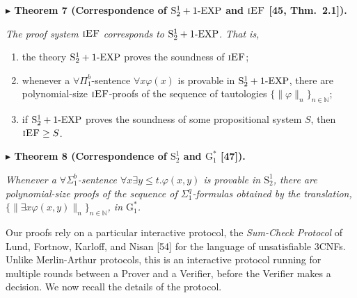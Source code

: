 \documentclass[11pt]{article}
\newcommand{\Stwo}{\mathrm{S}^{1}_{2}}
\newcommand{\oneEXP}{\textnormal{1-EXP}}
\newcommand{\iEF}{\textsc{iEF}}
\newcommand{\Gstar}{\mathrm{G}^{*}_{1}}
\newcommand{\N}{\mathbb{N}}
\newenvironment{statement}[1]%
  {\par\medskip\noindent\textbf{#1}\par\nopagebreak\smallskip\noindent\itshape}%
  {\par\medskip}
\begin{document}

\begin{statement}{$\blacktriangleright$ Theorem 7 (Correspondence of $\Stwo+\oneEXP$ and $\iEF$ [45, Thm.\ 2.1]).}
The proof system $\iEF$ corresponds to $\Stwo+\oneEXP$. That is,
\begin{enumerate}
\item[(i)] the theory $\Stwo+\oneEXP$ proves the soundness of $\iEF$;
\item[(ii)] whenever a $\forall\Pi^{b}_{1}$-sentence $\forall x\varphi(x)$ is provable in
  $\Stwo+\oneEXP$, there are polynomial-size $\iEF$-proofs of the sequence of tautologies
  $\{\|\varphi\|_{n}\}_{n\in\N}$;
\item[(iii)] if $\Stwo+\oneEXP$ proves the soundness of some propositional system $S$, then
  $\iEF \ge S$.
\end{enumerate}
\end{statement}

\begin{statement}{$\blacktriangleright$ Theorem 8 (Correspondence of $\Stwo$ and $\Gstar$ [47]).}
Whenever a $\forall\Sigma^{b}_{1}$-sentence $\forall x\exists y \le t.\varphi(x,y)$ is provable
in $\Stwo$, there are polynomial-size proofs of the sequence of $\Sigma^{q}_{1}$-formulas
obtained by the translation, $\{\|\exists x\varphi(x,y)\|_{n}\}_{n\in\N}$, in $\Gstar$.
\end{statement}



Our proofs rely on a particular interactive protocol, the \emph{Sum-Check Protocol} of Lund,
Fortnow, Karloff, and Nisan [54] for the language of unsatisfiable 3CNFs. Unlike
Merlin-Arthur protocols, this is an interactive protocol running for multiple rounds between
a Prover and a Verifier, before the Verifier makes a decision. We now recall the details of
the protocol.
\end{document}
